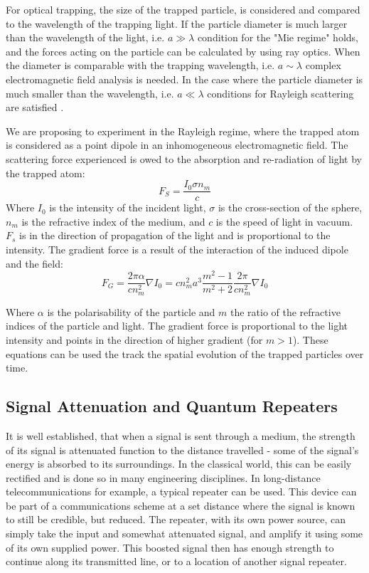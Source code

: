 \documentclass{epsrc}
\begin{document}
For optical trapping, the size of the trapped particle, is considered and compared to the wavelength of the trapping light. If the particle diameter is much larger than the wavelength of the light, i.e. $a\gg\lambda$ condition for the "Mie regime" holds, and the forces acting on the particle can be calculated by using ray optics. When the diameter is comparable with the trapping wavelength, i.e. $a \sim \lambda$ complex electromagnetic field analysis is needed. In the case where the particle diameter is much smaller than the wavelength, i.e. $a\ll\lambda$ conditions for Rayleigh scattering are satisfied .

We are proposing to experiment in the Rayleigh regime, where the trapped atom is considered as a point dipole in an inhomogeneous electromagnetic field. The scattering force experienced is owed to the absorption and re-radiation of light by the trapped atom:
\begin{equation}
    F_S=\frac{I_0 \sigma n_m}{c}
\end{equation}
Where $I_0$ is the intensity of the incident light, $\sigma$ is the cross-section of the sphere, $n_m$ is the refractive index of the medium, and $c$ is the speed of light in vacuum. $F_s$ is in the direction of propagation of the light and is proportional to the intensity.
The gradient force is a result of the interaction of the induced dipole and the field:
\begin{equation}
    F_G=\frac{2\pi\alpha}{cn^2_m}\nabla I_0 = cn^2_ma^3\frac{m^2-1}{m^2+2}\frac{2\pi}{cn^2_m}\nabla I_0
\end{equation}

Where $\alpha$ is the polarisability of the particle and $m$ the ratio of the refractive indices of the particle and light. The gradient force is proportional to the light intensity and points in the direction of higher gradient (for $m>1$). These equations can be used the track the spatial evolution of the trapped particles over time.


\vspace{10pt}

\subsection{Signal Attenuation and Quantum Repeaters}

It is well established, that when a signal is sent through a medium, the strength of its signal is attenuated function to the distance travelled - some of the signal's energy is absorbed to its surroundings. In the classical world, this can be easily rectified and is done so in many engineering disciplines. In long-distance telecommunications for example, a typical repeater can be used. This device can be part of a communications scheme at a set distance where the signal is known to still be credible, but reduced. The repeater, with its own power source, can simply take the input and somewhat attenuated signal, and amplify it using some of its own supplied power. This boosted signal then has enough strength to continue along its transmitted line, or to a location of another signal repeater.
\end{document}
